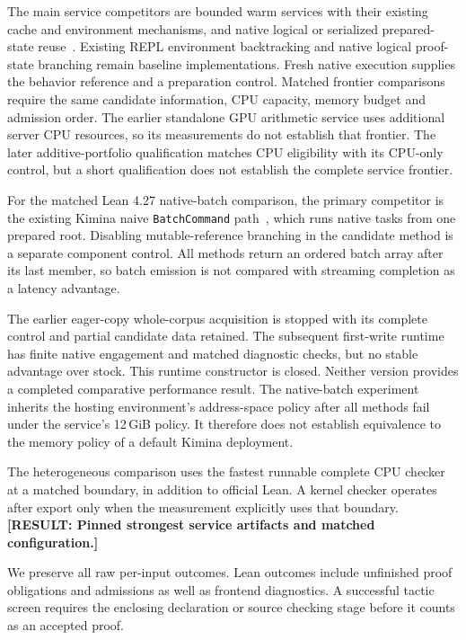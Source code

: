 \documentclass[10pt,twocolumn]{article}
\newcommand{\missing}[1]{\textbf{[RESULT: #1]}}
\begin{document}
The main service competitors are bounded warm services with their existing cache and environment mechanisms, and native logical or serialized prepared-state reuse~\cite{kimina,repl,leanIncremental}. Existing REPL environment backtracking and native logical proof-state branching remain baseline implementations. Fresh native execution supplies the behavior reference and a preparation control. Matched frontier comparisons require the same candidate information, CPU capacity, memory budget and admission order. The earlier standalone GPU arithmetic service uses additional server CPU resources, so its measurements do not establish that frontier. The later additive-portfolio qualification matches CPU eligibility with its CPU-only control, but a short qualification does not establish the complete service frontier.

For the matched Lean 4.27 native-batch comparison, the primary competitor is
the existing Kimina naive \texttt{BatchCommand} path~\cite{kimina}, which runs native tasks
from one prepared root. Disabling mutable-reference branching in the candidate method is a
separate component control. All methods return an ordered batch array after
its last member, so batch emission is not compared with streaming completion
as a latency advantage.

The earlier eager-copy whole-corpus acquisition is stopped with its complete
control and partial candidate data retained. The subsequent first-write runtime
has finite native engagement and matched diagnostic checks, but no stable
advantage over stock. This runtime constructor is closed. Neither version
provides a completed comparative performance result. The native-batch experiment inherits the hosting environment's address-space
policy after all methods fail under the service's 12\,GiB policy. It therefore
does not establish equivalence to the memory policy of a default Kimina deployment.

The heterogeneous comparison uses the fastest runnable complete CPU checker at a matched boundary, in addition to official Lean. A kernel checker operates after export only when the measurement explicitly uses that boundary. \missing{Pinned strongest service artifacts and matched configuration.}

We preserve all raw per-input outcomes. Lean outcomes include unfinished proof obligations and admissions as well as frontend diagnostics. A successful tactic screen requires the enclosing declaration or source checking stage before it counts as an accepted proof.
\end{document}
